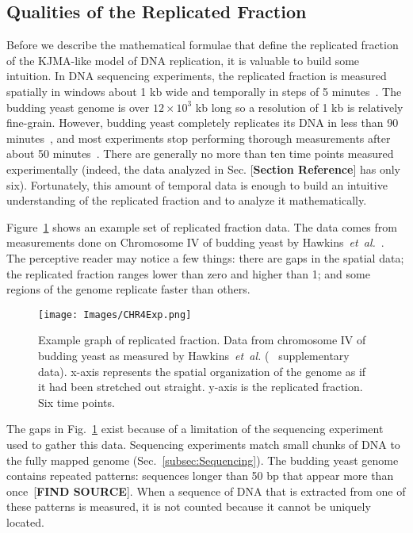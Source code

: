 	
		\subsection{Qualities of the Replicated Fraction}
		\label{subsec:QualitiesReplicatedFraction}
		
		Before we describe the mathematical formulae that define the replicated fraction of the KJMA-like model of DNA replication, it is valuable to build some intuition.
		In DNA sequencing experiments, the replicated fraction is measured spatially in windows about 1 kb wide and temporally in steps of 5 minutes~\cite{StochasticTermination}.
		The budding yeast genome is over $12\times10^3$ kb long so a resolution of 1 kb is relatively fine-grain.
		However, budding yeast completely replicates its DNA in less than 90 minutes~\cite{DeepSeq}, and most experiments stop performing thorough measurements after about 50 minutes~\cite{StochasticTermination,DeepSeq,McCuneMicroArray}.
		There are generally no more than ten time points measured experimentally (indeed, the data analyzed in Sec. [\textbf{Section Reference}] has only six).
		Fortunately, this amount of temporal data is enough to build an intuitive understanding of the replicated fraction and to analyze it mathematically.
		
		Figure~\ref{fig:ReplicatedFractionExample} shows an example set of replicated fraction data.
		The data comes from measurements done on Chromosome IV of budding yeast by Hawkins~\emph{et~al.}~\cite{StochasticTermination}.
		The perceptive reader may notice a few things:
		there are gaps in the spatial data;
		the replicated fraction ranges lower than zero and higher than 1;
		and some regions of the genome replicate faster than others.
		
		\begin{figure}[tbh]
			\begin{center}
				\texttt{[image: Images/CHR4Exp.png]}
			\end{center}
				\caption[Budding yeast Chromosome IV replicated fraction]{\label{fig:ReplicatedFractionExample} Example graph of replicated fraction.
					Data from chromosome IV of budding yeast as measured by Hawkins~\emph{et~al.} (~\cite{StochasticTermination} supplementary data).
					x-axis represents the spatial organization of the genome as if it had been stretched out straight.
					y-axis is the replicated fraction.
					Six time points.
				}
		\end{figure}
		
		The gaps in Fig.~\ref{fig:ReplicatedFractionExample} exist because of a limitation of the sequencing experiment used to gather this data.
		Sequencing experiments match small chunks of DNA to the fully mapped genome (Sec.~\ref{subsec:Sequencing}).
		The budding yeast genome contains repeated patterns: sequences longer than 50 bp that appear more than once~[\textbf{FIND SOURCE}].
		When a sequence of DNA that is extracted from one of these patterns is measured, it is not counted because it cannot be uniquely located.
		
